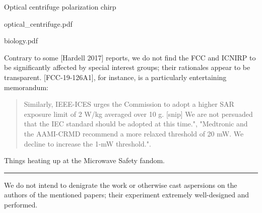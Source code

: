 \documentclass[paper.tex]{subfiles}
\begin{document}
\clearpage
{\Large Optical centrifuge polarization chirp}\\
\begin{multicols}{1}



{optical_centrifuge.pdf}




{biology.pdf}


\end{multicols}



Contrary to some [Hardell 2017] reports, we do not find the FCC and ICNIRP to be significantly affected by special interest groups; their rationales appear to be transparent.  [FCC-19-126A1], for instance, is a particularly entertaining memorandum:

\begin{quote} 
Similarly, IEEE-ICES urges the Commission to adopt a higher SAR exposure limit of 2 W/kg averaged over 10 g. [snip] We are not persuaded that the IEC standard should be adopted at this time.", "Medtronic and the AAMI-CRMD recommend a more relaxed threshold of 20 mW. We decline to increase the 1-mW threshold.". 

\end{quote}

Things heating up at the Microwave Safety fandom.


\clearpage
\rule{\linewidth}{0.2pt}

We do not intend to denigrate the work or otherwise cast aspersions on the authors of the mentioned papers; their experiment extremely well-designed and performed. 
\end{document}
